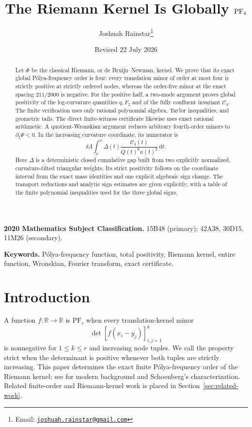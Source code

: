\documentclass[11pt]{article}
\title{The Riemann Kernel Is Globally \texorpdfstring{$\PF_4$}{PF4}}
\author{Joshuah Rainstar\thanks{Email:
\href{mailto:joshuah.rainstar@gmail.com}{\texttt{joshuah.rainstar@gmail.com}}}}
\date{Revised 22 July 2026}
\theoremstyle{remark}
\newcommand{\R}{\mathbb{R}}
\newcommand{\Cfour}{\mathcal{C}_4}
\newcommand{\dd}{\,\mathrm{d}}
\newcommand{\PF}{\mathrm{PF}}
\newcommand{\secref}[1]{Section~\ref{#1}}
\numberwithin{equation}{section}
\begin{document}
\maketitle
\begin{abstract}
Let \(\Phi\) be the classical Riemann, or de Bruijn--Newman, kernel. We prove
that its exact global P\'olya-frequency order is four: every translation minor
of order at most four is strictly positive at strictly ordered nodes, whereas
the order-five minor at the exact spacing \(211/2000\) is negative. For the
positive half, a two-mode
argument proves global positivity of the log-curvature quantities \(q,F_2\)
and of the fully confluent invariant \(\Cfour\). The finite verification uses
only rational polynomial algebra, Taylor inequalities, and geometric tails.
The direct finite-witness certificate likewise uses exact rational arithmetic.
A
quotient-Wronskian argument reduces arbitrary fourth-order minors to
\(\partial_\xi\Psi<0\). In the increasing curvature coordinate, its numerator
is
\[
 \delta\Lambda\int_p^w
 \Delta(t)\frac{\Cfour(t)}{Q(t)^6\kappa(t)^2}\dd t.
\]
Here \(\Delta\) is a deterministic closed cumulative gap built from two
explicitly normalized, curvature-tilted triangular weights. Its strict
positivity follows on the coordinate interval from the exact mass identities
and one explicit algebraic sign change. The transport
reductions and analytic sign estimates are given explicitly, with a table of
the finite polynomial inequalities used for the three global signs.
\end{abstract}
\noindent\textbf{2020 Mathematics Subject Classification.}
15B48 (primary); 42A38, 30D15, 11M26 (secondary).

\noindent\textbf{Keywords.}
P\'olya-frequency function, total positivity, Riemann kernel, entire function,
Wronskian, Fourier transform, exact certificate.
\tableofcontents

\section{Introduction}\label{sec:introduction}

A function \(f:\R\to\R\) is \(\PF_r\) when every translation-kernel minor
\[
 \det[f(x_i-y_j)]_{i,j=1}^k
\]
is nonnegative for \(1\leq k\leq r\) and increasing node tuples. We call the
property strict when the determinant is positive whenever both tuples are
strictly increasing. This paper determines the exact finite P\'olya-frequency
order of the Riemann kernel; see \cite{belton} for modern background and
Schoenberg's characterization. Related finite-order and Riemann-kernel work is
placed in \secref{sec:related-work}.
\end{document}
